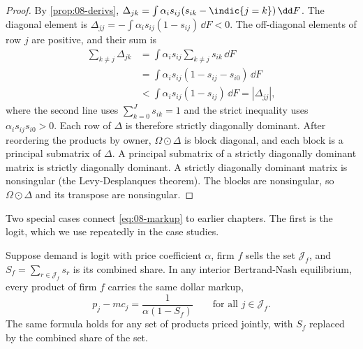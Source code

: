 \begin{proof}
By \cref{prop:08-derivs}, $\Delta_{jk} = \int \alpha_i s_{ij}(s_{ik} - \indic\{j = k\})\,\dd F$. The diagonal
element is $\Delta_{jj} = -\int \alpha_i s_{ij}(1 - s_{ij})\,\dd F < 0$. The off-diagonal elements of row $j$ are
positive, and their sum is
\begin{align*}
  \sum_{k \neq j} \Delta_{jk} &= \int \alpha_i s_{ij} \sum_{k \neq j} s_{ik}\,\dd F \\
  &= \int \alpha_i s_{ij}(1 - s_{ij} - s_{i0})\,\dd F \\
  &< \int \alpha_i s_{ij}(1 - s_{ij})\,\dd F = |\Delta_{jj}| ,
\end{align*}
where the second line uses $\sum_{k=0}^{J} s_{ik} = 1$ and the strict inequality uses $\alpha_i s_{ij} s_{i0} > 0$.
Each row of $\Delta$ is therefore strictly diagonally dominant. After reordering the products by owner,
$\Omega\odot\Delta$ is block diagonal, and each block is a principal submatrix of $\Delta$. A principal submatrix of a
strictly diagonally dominant matrix is strictly diagonally dominant. A strictly diagonally dominant matrix is
nonsingular (the Levy-Desplanques theorem). The blocks are nonsingular, so $\Omega\odot\Delta$ and its transpose are
nonsingular.
\end{proof}

Two special cases connect \eqref{eq:08-markup} to earlier chapters. The first is the logit, which we use repeatedly in
the case studies.

\begin{proposition}\label{prop:08-logit-markup}
Suppose demand is logit with price coefficient $\alpha$, firm $f$ sells the set $\mathcal{J}_f$, and
$S_f = \sum_{r\in\mathcal{J}_f}s_r$ is its combined share. In any interior Bertrand-Nash equilibrium, every product of
firm $f$ carries the same dollar markup,
\begin{equation}\label{eq:08-logit-markup-firm}
  p_j - mc_j = \frac{1}{\alpha(1 - S_f)} \qquad \text{for all } j \in \mathcal{J}_f .
\end{equation}
The same formula holds for any set of products priced jointly, with $S_f$ replaced by the combined share of the set.
\end{proposition}

